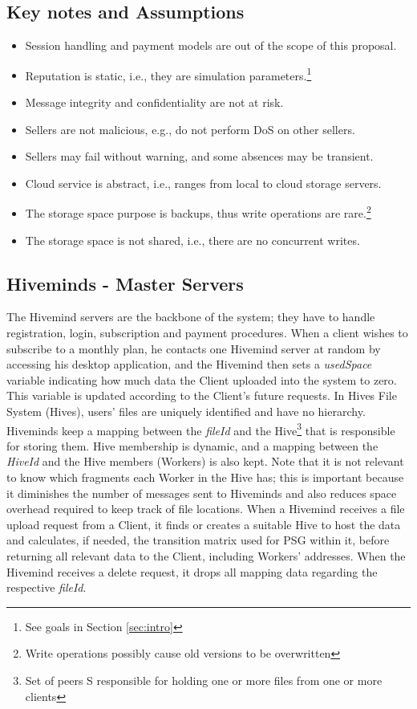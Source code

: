 \documentclass[runningheads]{llncs}
\begin{document}
\subsection{Key notes and Assumptions}
\begin{itemize}
    \item Session handling and payment models are out of the scope of this proposal.
    \item Reputation is static, i.e., they are simulation parameters.\footnote{See goals in Section \ref{sec:intro}}
    \item Message integrity and confidentiality are not at risk.
    \item Sellers are not malicious, e.g., do not perform DoS on other sellers.
    \item Sellers may fail without warning, and some absences may be transient.
    \item Cloud service is abstract, i.e., ranges from local to cloud storage servers.
    \item The storage space purpose is backups, thus write operations are rare.\footnote{Write operations possibly cause old versions to be overwritten}
    \item The storage space is not shared, i.e., there are no concurrent writes.
\end{itemize}

\subsection{Hiveminds - Master Servers}
The Hivemind servers are the backbone of the system; they have to handle registration, login, subscription and payment procedures. When a client wishes to subscribe to a monthly plan, he contacts one Hivemind server at random by accessing his desktop application, and the Hivemind then sets a \textit{usedSpace} variable indicating how much data the Client uploaded into the system to zero. This variable is updated according to the Client's future requests. In Hives File System (Hives), users' files are uniquely identified and have no hierarchy. Hiveminds keep a mapping between the \textit{fileId} and the Hive\footnote{Set of peers S responsible for holding one or more files from one or more clients} that is responsible for storing them. Hive membership is dynamic, and a mapping between the \textit{HiveId} and the Hive members (Workers) is also kept. Note that it is not relevant to know which fragments each Worker in the Hive has; this is important because it diminishes the number of messages sent to Hiveminds and also reduces space overhead required to keep track of file locations. When a Hivemind receives a file upload request from a Client, it finds or creates a suitable Hive to host the data and calculates, if needed, the transition matrix used for PSG within it, before returning all relevant data to the Client, including Workers' addresses. When the Hivemind receives a delete request, it drops all mapping data regarding the respective \textit{fileId}.
\end{document}
